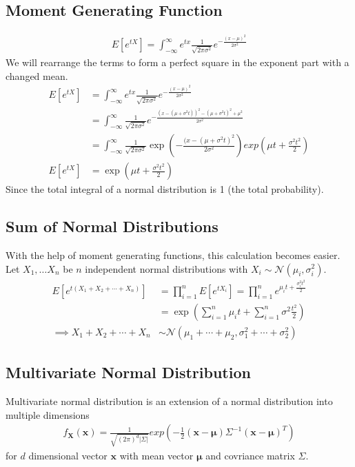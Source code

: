 \documentclass[../../probability-notes.tex]{subfiles}
\begin{document}
    \subsection{Moment Generating Function}
    \begin{align*}
        E[e^{tX}] = \int_{-\infty}^{\infty} e^{tx} \frac{1}{\sqrt{2\pi \sigma^{2}}} e^{-\frac{(x-\mu)^{2}}{2 \sigma^{2}}}
    \end{align*}
    We will rearrange the terms to form a perfect square in the exponent part with a changed mean.
    \begin{align*}
        E[e^{tX}] &= \int_{-\infty}^{\infty} e^{tx} \frac{1}{\sqrt{2\pi \sigma^{2}}} e^{-\frac{(x-\mu)^{2}}{2 \sigma^{2}}}\\
        &= \int_{-\infty}^{\infty}\frac{1}{\sqrt{2\pi \sigma^{2}}}e^{-\frac{(x-(\mu+\sigma^{2}t))^{2} - (\mu+\sigma^{2}t)^{2} + \mu^{2}}{2 \sigma^{2}}}\\
        &= \int_{-\infty}^{\infty}\frac{1}{\sqrt{2\pi \sigma^{2}}} \exp(-\frac{(x-(\mu+\sigma^{2}t)^{2}}{2 \sigma^{2}}) exp(\mu t + \frac{\sigma^{2} t^{2}}{2})\\
        E[e^{tX}] &= \exp(\mu t + \frac{\sigma^{2} t^{2}}{2})
    \end{align*}
    Since the total integral of a normal distribution is 1 (the total probability).

    \subsection{Sum of Normal Distributions}
    With the help of moment generating functions, this calculation becomes easier. Let $X_{1}, \ldots X_{n}$ be $n$ independent normal distributions with $X_{i} \sim \mathcal{N}(\mu_{i}, \sigma^{2}_{i})$.
    \begin{align*}
        E[e^{t(X_{1} + X_{2} + \cdots + X_{n})}] &= \prod_{i=1}^{n} E[e^{tX_{i}}] = \prod_{i=1}^{n} e^{\mu_{i} t + \frac{\sigma_{i}^{2} t^{2}}{2}}\\
        &= \exp(\sum_{i=1}^{n} \mu_{i} t+ \sum_{i=1}^{n}\sigma^{2} \frac{t^{2}}{2})\\
        \implies X_{1} + X_{2} + \cdots + X_{n} &\sim \mathcal{N}(\mu_{1} + \cdots + \mu_{2}, \sigma_{1}^{2} + \cdots + \sigma_{2}^{2})
    \end{align*}

    \subsection{Multivariate Normal Distribution}
    Multivariate normal distribution is an extension of a normal distribution into multiple dimensions
    \begin{align*}
        f_{\mathbf{X}}(\bm{x}) = \frac{1}{\sqrt{(2\pi)^{d} \lvert \Sigma \rvert}} exp(-\frac{1}{2}(\mathbf{x} - \bm{\mu})\Sigma^{-1}(\mathbf{x} - \bm{\mu})^{T})
    \end{align*}
    for $d$ dimensional vector $\mathbf{x}$ with mean vector $\bm{\mu}$ and covriance matrix $\Sigma$.
\end{document}
